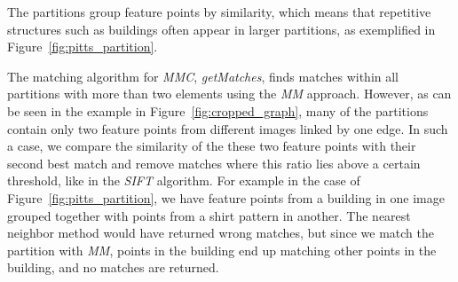 \documentclass{article}
\begin{document}
The partitions group feature points by similarity, which means that 
repetitive structures such as buildings often appear in larger 
partitions, as exemplified in Figure~\ref{fig:pitts_partition}.
%
%		
%

The matching algorithm for \emph{MMC}, \emph{getMatches}, finds matches 
within all partitions with more than two elements using the \emph{MM} 
approach.  However, as can be seen in the example in 
Figure~\ref{fig:cropped_graph}, many of the partitions contain only two 
feature points from different images linked by one edge. In such a case, 
we compare the similarity of the these two feature points with their 
second best match and remove matches where this ratio lies above a 
certain threshold, like in the \emph{SIFT} algorithm. For example in the 
case of Figure~\ref{fig:pitts_partition}, we have feature points from a 
building in one image grouped together with points from a shirt pattern 
in another.  The nearest neighbor method would have returned wrong 
matches, but since we match the partition with \emph{MM}, points in the 
building end up matching other points in the building, and no matches 
are returned.
\end{document}
